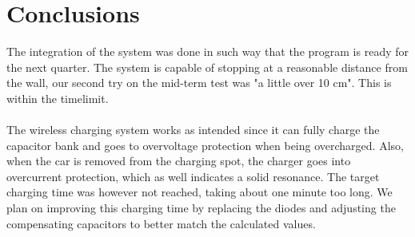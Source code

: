 \documentclass[final]{scrreprt} %
\begin{document}
\chapter{Conclusions}

The integration of the system was done in such way that the program is ready for the next quarter.
The system is capable of stopping at a reasonable distance from the wall, our second try on the mid-term test was "a little over 10 cm".
This is within the timelimit.
\\ \\
The wireless charging system works as intended since it can fully charge the capacitor bank and goes to overvoltage protection when being overcharged.
Also, when the car is removed from the charging spot, the charger goes into overcurrent protection, which as well indicates a solid resonance.
The target charging time was however not reached, taking about one minute too long.
We plan on improving this charging time by replacing the diodes and adjusting the compensating capacitors to better match the calculated values.
\end{document}

